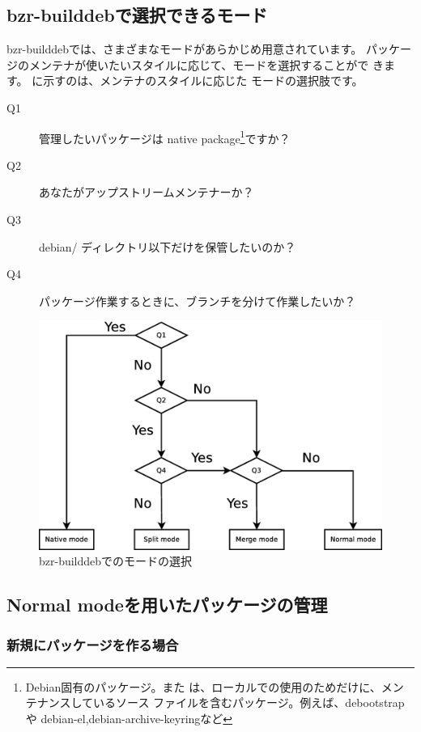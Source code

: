\documentclass[mingoth,a4paper]{jsarticle}
\begin{document}
\subsection{bzr-builddebで選択できるモード}

bzr-builddebでは、さまざまなモードがあらかじめ用意されています。
パッケージのメンテナが使いたいスタイルに応じて、モードを選択することがで
きます。
に示すのは、メンテナのスタイルに応じた
モードの選択肢です。

\begin{description}
 \item[Q1] 管理したいパッケージは
	    native package\footnote{Debian固有のパッケージ。また
	    は、ローカルでの使用のためだけに、メンテナンスしているソース
	    ファイルを含むパッケージ。例えば、debootstrapや
	    debian-el,debian-archive-keyringなど}ですか？
 \item[Q2] あなたがアップストリームメンテナーか？
 \item[Q3] debian/ ディレクトリ以下だけを保管したいのか？
 \item[Q4] パッケージ作業するときに、ブランチを分けて作業したいか？
\end{description}

\begin{figure}[h]
 \begin{center}
  \includegraphics[width=0.6\hsize]{image201109/bzr-builddeb-selectmode.eps}
 \end{center}
 \caption{bzr-builddebでのモードの選択}
 \label{bzr-select-mode}
\end{figure}

\clearpage

\subsection{Normal modeを用いたパッケージの管理}

\subsubsection{新規にパッケージを作る場合}
\end{document}
